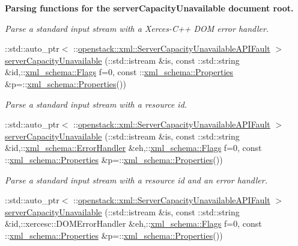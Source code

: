 \begin{Indent}{\bf Parsing functions for the serverCapacityUnavailable document root.}
\begin{DoxyCompactItemize}
\begin{DoxyCompactList}\small\item\em Parse a standard input stream with a Xerces-\/C++ DOM error handler. \item\end{DoxyCompactList}\item 
::std::auto\_\-ptr$<$ ::\hyperlink{classopenstack_1_1xml_1_1ServerCapacityUnavailableAPIFault}{openstack::xml::ServerCapacityUnavailableAPIFault} $>$ \hyperlink{namespaceopenstack_1_1xml_a557ab11c960319bc802c44acb2276f14}{serverCapacityUnavailable} (::std::istream \&is, const ::std::string \&id,::\hyperlink{namespacexml__schema_affb4c227cbd9aa7453dd1dc5a1401943}{xml\_\-schema::Flags} f=0, const ::\hyperlink{namespacexml__schema_ad27ce19a7ee1d3b1064092648898f64c}{xml\_\-schema::Properties} \&p=::\hyperlink{namespacexml__schema_ad27ce19a7ee1d3b1064092648898f64c}{xml\_\-schema::Properties}())
\begin{DoxyCompactList}\small\item\em Parse a standard input stream with a resource id. \item\end{DoxyCompactList}\item 
::std::auto\_\-ptr$<$ ::\hyperlink{classopenstack_1_1xml_1_1ServerCapacityUnavailableAPIFault}{openstack::xml::ServerCapacityUnavailableAPIFault} $>$ \hyperlink{namespaceopenstack_1_1xml_a0e779558415a8ad3042cb8e990a4f4d6}{serverCapacityUnavailable} (::std::istream \&is, const ::std::string \&id,::\hyperlink{namespacexml__schema_ab1c9361bfd3b404eaabf0c31eded79dc}{xml\_\-schema::ErrorHandler} \&eh,::\hyperlink{namespacexml__schema_affb4c227cbd9aa7453dd1dc5a1401943}{xml\_\-schema::Flags} f=0, const ::\hyperlink{namespacexml__schema_ad27ce19a7ee1d3b1064092648898f64c}{xml\_\-schema::Properties} \&p=::\hyperlink{namespacexml__schema_ad27ce19a7ee1d3b1064092648898f64c}{xml\_\-schema::Properties}())
\begin{DoxyCompactList}\small\item\em Parse a standard input stream with a resource id and an error handler. \item\end{DoxyCompactList}\item 
::std::auto\_\-ptr$<$ ::\hyperlink{classopenstack_1_1xml_1_1ServerCapacityUnavailableAPIFault}{openstack::xml::ServerCapacityUnavailableAPIFault} $>$ \hyperlink{namespaceopenstack_1_1xml_a0a989e8019a08e0ce69112fa2e5657c0}{serverCapacityUnavailable} (::std::istream \&is, const ::std::string \&id,::xercesc::DOMErrorHandler \&eh,::\hyperlink{namespacexml__schema_affb4c227cbd9aa7453dd1dc5a1401943}{xml\_\-schema::Flags} f=0, const ::\hyperlink{namespacexml__schema_ad27ce19a7ee1d3b1064092648898f64c}{xml\_\-schema::Properties} \&p=::\hyperlink{namespacexml__schema_ad27ce19a7ee1d3b1064092648898f64c}{xml\_\-schema::Properties}())

\end{DoxyCompactItemize}
\end{Indent}
